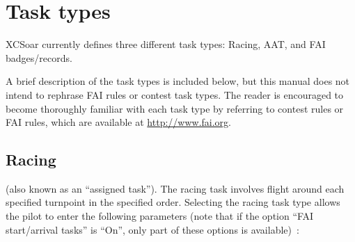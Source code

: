 \section{Task types}
XCSoar currently defines three different task types: Racing, AAT, and FAI badges/records.

A brief description of the task types is included below, but this manual does
not intend to rephrase FAI rules or contest task types. The reader is encouraged
to become thoroughly familiar with each task type by referring to contest rules
or FAI rules, which are available at \url{http://www.fai.org}.


\subsection*{Racing}\label{sec:task-type-racing}
(also known as an ``assigned task'').  The racing task involves flight
around each specified turnpoint in the specified order.  Selecting the racing task
type allows the pilot to enter the following parameters
(note that if the option
``FAI start/arrival tasks'' is ``On'', only part of these options is available)~:
